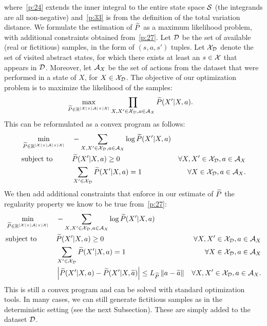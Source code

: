where~\eqref{p:24} extends the inner integral to the entire state space $\mathcal{S}$ (the integrands are all non-negative) and~\eqref{p:33} is from the definition of the total variation distance.
We formulate the estimation of $\widetilde{P}$ as a maximum likelihood problem, with additional constraints obtained from~\eqref{p:27}.
Let $\mathcal{D}$ be the set of available (real or fictitious) samples, in the form of $(s,a,s')$ tuples. Let $\mathcal{X}_{\mathcal{D}}$ denote the set of visited abstract states, \ie for which there exists at least an $s\in\mathcal{X}$ that appears in $\mathcal{D}$. Moreover, let $\mathcal{A}_{X}$ be the set of actions from the dataset that were performed in a state of $X$, for $X\in\mathcal{X}_{\mathcal{D}}$. 
The objective of our optimization problem is to maximize the likelihood of the samples:
%
\begin{align}
&\max_{\widetilde{P}\in\mathbb{R}^{|\mathcal{X}|\times|\mathcal{A}|\times|\mathcal{X}|}} \prod_{X,X'\in\mathcal{X}_{\mathcal{D}}, a\in\mathcal{A}_{X}}\widetilde{P}(X'|X,a).
\end{align}
%
This can be reformulated as a convex program as follows:
%
\begin{align}
&\min_{\widetilde{P}\in\mathbb{R}^{|\mathcal{X}|\times|\mathcal{A}|\times|\mathcal{X}|}} &&-\sum_{X,X'\in\mathcal{X}_{\mathcal{D}}, a\in\mathcal{A}_{X}}\log\widetilde{P}(X'|X,a) \nonumber\\
&\text{subject to} &&\widetilde{P}(X'|X,a) \geq 0 &\forall X,X'\in\mathcal{X}_{\mathcal{D}}, a\in\mathcal{A}_{X} \nonumber\\
& &&\sum_{X'\in\mathcal{X}_{\mathcal{D}}}\widetilde{P}(X'|X,a) = 1 &\forall X\in\mathcal{X}_{\mathcal{D}}, a\in\mathcal{A}_{X}.
\end{align}
%
We then add additional constraints that enforce in our estimate of $\widetilde{P}$ the regularity property we know to be true from~\eqref{p:27}:
%
\begin{align}
&\min_{\widetilde{P}\in\mathbb{R}^{|\mathcal{X}|\times|\mathcal{A}|\times|\mathcal{X}|}} &&-\sum_{X,X'\in\mathcal{X}_{\mathcal{D}}, a\in\mathcal{A}_{X}}\log\widetilde{P}(X'|X,a) \nonumber\\
&\text{subject to} &&\widetilde{P}(X'|X,a) \geq 0 &\forall X,X'\in\mathcal{X}_{\mathcal{D}}, a\in\mathcal{A}_{X} \nonumber\\
& &&\sum_{X'\in\mathcal{X}_{\mathcal{D}}}\widetilde{P}(X'|X,a) = 1 &\forall X\in\mathcal{X}_{\mathcal{D}}, a\in\mathcal{A}_{X} \nonumber\\
& &&\left|\widetilde{P}(X'|X,a) - \widetilde{P}(X'|X,\widetilde{a})\right| \leq L_{\widetilde{P}}\left\|a- \widetilde{a}\right\|_{} &\forall X,X'\in\mathcal{X}_{\mathcal{D}}, a\in\mathcal{A}_{X}. \label{p:26}
\end{align}
%
This is still a convex program and can be solved with standard optimization tools.
In many cases, we can still generate fictitious samples as in the deterministic setting (see the next Subsection). These are simply added to the dataset $\mathcal{D}$. 


